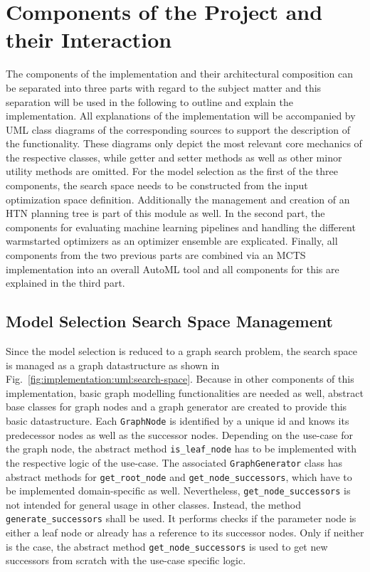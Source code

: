 \section{Components of the Project and their Interaction}
\label{sec:implementation:components}
The components of the implementation and their architectural composition can be separated into three parts with regard to the subject matter and this separation will be used in the following to outline and explain the implementation.
All explanations of the implementation will be accompanied by UML class diagrams of the corresponding sources to support the description of the functionality.
These diagrams only depict the most relevant core mechanics of the respective classes, while getter and setter methods as well as other minor utility methods are omitted.\newline 
For the model selection as the first of the three components, the search space needs to be constructed from the input optimization space definition.
Additionally the management and creation of an HTN planning tree is part of this module as well.\newline
In the second part, the components for evaluating machine learning pipelines and handling the different warmstarted optimizers as an optimizer ensemble are explicated.\newline
Finally, all components from the two previous parts are combined via an MCTS implementation into an overall AutoML tool and all components for this are explained in the third part.

\subsection{Model Selection Search Space Management}
\label{sec:implementation:components:search-space}
Since the model selection is reduced to a graph search problem, the search space is managed as a graph datastructure as shown in Fig.~\ref{fig:implementation:uml:search-space}.
Because in other components of this implementation, basic graph modelling functionalities are needed as well, abstract base classes for graph nodes and a graph generator are created to provide this basic datastructure.\newline
Each \texttt{GraphNode} is identified by a unique id and knows its predecessor nodes as well as the successor nodes.
Depending on the use-case for the graph node, the abstract method \texttt{is\_leaf\_node} has to be implemented with the respective logic of the use-case.\newline
The associated \texttt{GraphGenerator} class has abstract methods for \texttt{get\_root\_node} and \texttt{get\_node\_successors}, which have to be implemented domain-specific as well.
Nevertheless, \texttt{get\_node\_successors} is not intended for general usage in other classes.
Instead, the method \texttt{generate\_successors} shall be used.
It performs checks if the parameter node is either a leaf node or already has a reference to its successor nodes.
Only if neither is the case, the abstract method \texttt{get\_node\_successors} is used to get new successors from scratch with the use-case specific logic.


